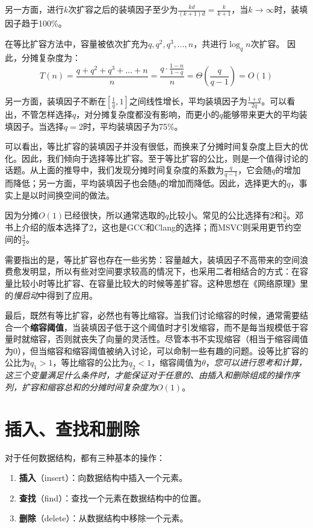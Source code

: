 另一方面，进行$k$次扩容之后的装填因子至少为$\frac{kd}{(k+1)d}=\frac{k}{k+1}$，当$k\to\infty$时，装填因子趋于100\%。

在等比扩容方法中，容量被依次扩充为$q,q^2,q^3,\dots,n$，共进行$\log _q n$次扩容。
因此，分摊复杂度为：
$$
T(n)=\frac{q+q^2+q^3+\dots+n}n=\frac{q\cdot\frac{1-n}{1-q}}n=\Theta\left(\frac{q}{q-1}\right)=O(1)
$$

另一方面，装填因子不断在$\left[\frac 1q,1\right]$之间线性增长，平均装填因子为$\frac{1+q}{2q}$。可以看出，不管怎样选择$q$，对分摊复杂度都没有影响，而更小的$q$能够带来更大的平均装填因子。当选择$q=2$时，平均装填因子为75\%。

可以看出，等比扩容的装填因子并没有很低，而换来了分摊时间复杂度上巨大的优化。因此，我们倾向于选择等比扩容。至于等比扩容的公比，则是一个值得讨论的话题。从上面的推导中，我们发现分摊时间复杂度的系数为$\frac{q}{q-1}$，它会随$q$的增加而降低；另一方面，平均装填因子也会随$q$的增加而降低。因此，选择更大的$q$，事实上是以时间换空间的做法。

因为分摊$O(1)$已经很快，所以通常选取的$q$比较小。常见的公比选择有2和$\frac{3}{2}$。邓书上介绍的版本选择了2，这也是GCC和Clang的选择；而MSVC则采用更节约空间的$\frac{3}{2}$。

需要指出的是，等比扩容也存在一些劣势：容量越大，装填因子不高带来的空间浪费愈发明显，所以有些对空间要求较高的情况下，也采用二者相结合的方式：在容量比较小时等比扩容、在容量比较大的时候等差扩容。这种思想在《网络原理》里的\textit{慢启动}中得到了应用。

最后，既然有等比扩容，必然也有等比缩容。当我们讨论缩容的时候，通常需要结合一个\textbf{缩容阈值}，当装填因子低于这个阈值时才引发缩容，而不是每当规模低于容量时就缩容，否则就丧失了向量的灵活性。尽管本书不实现缩容（相当于缩容阈值为0），但当缩容和缩容阈值被纳入讨论，可以命制一些有趣的问题。设等比扩容的公比为$q_1>1$，等比缩容的公比为$q_2 <1$，缩容阈值为$\theta$，\textit{您可以进行思考和计算，这三个变量满足什么条件时，才能保证对于任意的、由插入和删除组成的操作序列，扩容和缩容总和的分摊时间复杂度为}$O(1)$。

\section{插入、查找和删除}

对于任何数据结构，都有三种基本的操作：
\begin{enumerate}
    \item \textbf{插入}（insert）：向数据结构中插入一个元素。
    \item \textbf{查找}（find）：查找一个元素在数据结构中的位置。
    \item \textbf{删除}（delete）：从数据结构中移除一个元素。
\end{enumerate}


